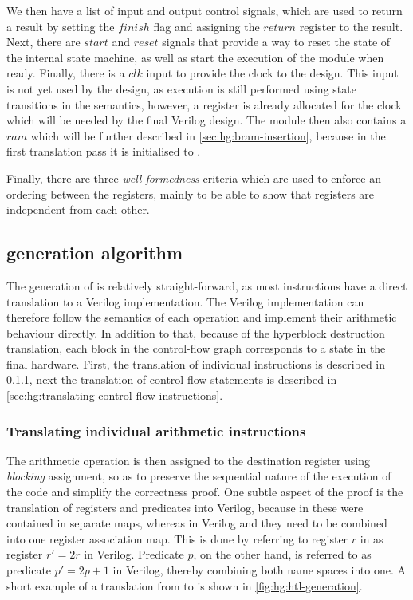 We then have a list of input and output control signals, which are used to
return a result by setting the $\mathit{finish}$ flag and assigning the
$\mathit{return}$ register to the result.  Next, there are $\mathit{start}$ and
$\mathit{reset}$ signals that provide a way to reset the state of the internal
state machine, as well as start the execution of the module when ready.
Finally, there is a $\mathit{clk}$ input to provide the clock to the design.
This input is not yet used by the \htl{} design, as execution is still performed
using state transitions in the semantics, however, a register is already
allocated for the clock which will be needed by the final Verilog design.  The
module then also contains a $\mathit{ram}$ which will be further described in
\cref{sec:hg:bram-insertion}, because in the first translation pass it is
initialised to \cnone.

Finally, there are three \emph{well-formedness} criteria which are used to
enforce an ordering between the registers, mainly to be able to show that
registers are independent from each other.

\subsection{\htl{} generation algorithm}%
\label{sec:hg:htl-generation-algorithm}

The generation of \htl{} is relatively straight-forward, as most instructions
have a direct translation to a Verilog implementation.  The Verilog
implementation can therefore follow the semantics of each operation and
implement their arithmetic behaviour directly.  In addition to that, because of
the hyperblock destruction translation, each block in the control-flow graph
corresponds to a state in the final hardware.  First, the translation of
individual instructions is described in
\cref{sec:hg:translating-individual-arithmetic-instructions}, next the
translation of control-flow statements is described in
\cref{sec:hg:translating-control-flow-instructions}.

\subsubsection{Translating individual arithmetic instructions}%
\label{sec:hg:translating-individual-arithmetic-instructions}

The arithmetic operation is then assigned to the destination register using
\emph{blocking} assignment, so as to preserve the sequential nature of the
execution of the code and simplify the correctness proof.  One subtle aspect of
the proof is the translation of registers and predicates into Verilog, because
in \rtlsubpar{} these were contained in separate maps, whereas in Verilog and
\htl{} they need to be combined into one register association map.  This is done
by referring to register $r$ in \rtlsubpar{} as register $r' = 2r$ in Verilog.
Predicate $p$, on the other hand, is referred to as predicate $p' = 2p + 1$ in
Verilog, thereby combining both name spaces into one.  A short example of a
translation from \rtlsubpar{} to \htl{} is shown in
\cref{fig:hg:htl-generation}.

